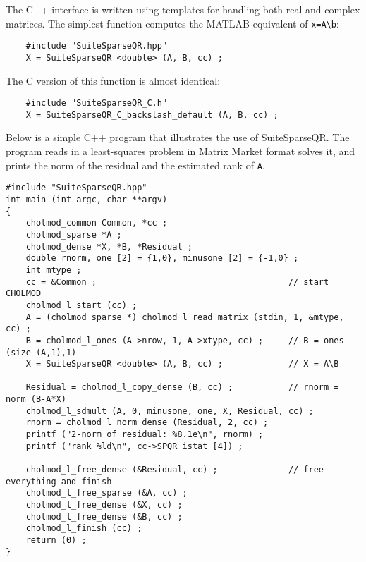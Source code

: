 \documentclass[12pt]{article}
\begin{document}

The C++ interface is written using templates for handling both real and complex
matrices.  The simplest function computes the MATLAB equivalent of
\verb'x=A\b':

{\footnotesize
\begin{verbatim}
    #include "SuiteSparseQR.hpp"
    X = SuiteSparseQR <double> (A, B, cc) ;
\end{verbatim}
}

The C version of this function is almost identical:

{\footnotesize
\begin{verbatim}
    #include "SuiteSparseQR_C.h"
    X = SuiteSparseQR_C_backslash_default (A, B, cc) ;
\end{verbatim}
}

Below is a simple C++ program that illustrates the use of SuiteSparseQR.  The
program reads in a least-squares problem in Matrix Market format
solves it, and prints the norm
of the residual and the estimated rank of \verb'A'.

{\footnotesize
\begin{verbatim}
#include "SuiteSparseQR.hpp"
int main (int argc, char **argv)
{
    cholmod_common Common, *cc ;
    cholmod_sparse *A ;
    cholmod_dense *X, *B, *Residual ;
    double rnorm, one [2] = {1,0}, minusone [2] = {-1,0} ;
    int mtype ;
    cc = &Common ;                                      // start CHOLMOD
    cholmod_l_start (cc) ;
    A = (cholmod_sparse *) cholmod_l_read_matrix (stdin, 1, &mtype, cc) ;
    B = cholmod_l_ones (A->nrow, 1, A->xtype, cc) ;     // B = ones (size (A,1),1)
    X = SuiteSparseQR <double> (A, B, cc) ;             // X = A\B

    Residual = cholmod_l_copy_dense (B, cc) ;           // rnorm = norm (B-A*X)
    cholmod_l_sdmult (A, 0, minusone, one, X, Residual, cc) ;
    rnorm = cholmod_l_norm_dense (Residual, 2, cc) ;
    printf ("2-norm of residual: %8.1e\n", rnorm) ;
    printf ("rank %ld\n", cc->SPQR_istat [4]) ;

    cholmod_l_free_dense (&Residual, cc) ;              // free everything and finish
    cholmod_l_free_sparse (&A, cc) ;
    cholmod_l_free_dense (&X, cc) ;
    cholmod_l_free_dense (&B, cc) ;
    cholmod_l_finish (cc) ;
    return (0) ;
}
\end{verbatim}
}
\end{document}

